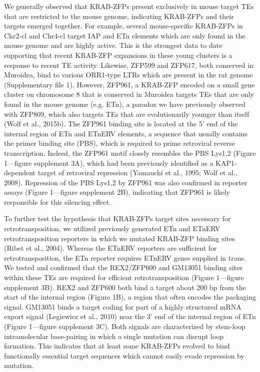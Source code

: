 \documentclass[11pt,a4paper]{article}
\begin{document}
We generally observed that KRAB-ZFPs present exclusively in mouse target TEs that are restricted to the mouse genome, indicating KRAB-ZFPs and their targets emerged together. For example, several mouse-specific KRAB-ZFPs in Chr2-cl and Chr4-cl target IAP and ETn elements which are only found in the mouse genome and are highly active. This is the strongest data to date supporting that recent KRAB-ZFP expansions in these young clusters is a response to recent TE activity. Likewise, ZFP599 and ZFP617, both conserved in Muroidea, bind to various ORR1-type LTRs which are present in the rat genome (Supplementary file 1). However, ZFP961, a KRAB-ZFP encoded on a small gene cluster on chromosome 8 that is conserved in Muroidea targets TEs that are only found in the mouse genome (e.g. ETn), a paradox we have previously observed with ZFP809, which also targets TEs that are evolutionarily younger than itself (Wolf et al., 2015b). The ZFP961 binding site is located at the 5’ end of the internal region of ETn and ETnERV elements, a sequence that usually contains the primer binding site (PBS), which is required to prime retroviral reverse transcription. Indeed, the ZFP961 motif closely resembles the PBS Lys1,2 (Figure 1—figure supplement 3A), which had been previously identified as a KAP1-dependent target of retroviral repression (Yamauchi et al., 1995; Wolf et al., 2008). Repression of the PBS Lys1,2 by ZFP961 was also confirmed in reporter assays (Figure 1—figure supplement 2B), indicating that ZFP961 is likely responsible for this silencing effect.

To further test the hypothesis that KRAB-ZFPs target sites necessary for retrotransposition, we utilized previously generated ETn and ETnERV retrotransposition reporters in which we mutated KRAB-ZFP binding sites (Ribet et al., 2004). Whereas the ETnERV reporters are sufficient for retrotransposition, the ETn reporter requires ETnERV genes supplied in trans. We tested and confirmed that the REX2/ZFP600 and GM13051 binding sites within these TEs are required for efficient retrotransposition (Figure 1—figure supplement 3B). REX2 and ZFP600 both bind a target about 200 bp from the start of the internal region (Figure 1B), a region that often encodes the packaging signal. GM13051 binds a target coding for part of a highly structured mRNA export signal (Legiewicz et al., 2010) near the 3’ end of the internal region of ETn (Figure 1—figure supplement 3C). Both signals are characterized by stem-loop intramolecular base-pairing in which a single mutation can disrupt loop formation. This indicates that at least some KRAB-ZFPs evolved to bind functionally essential target sequences which cannot easily evade repression by mutation.
\end{document}
